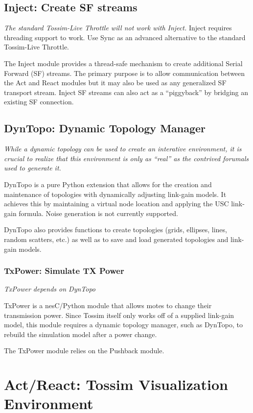 \subsection{Inject: Create SF streams}

{\em The standard Tossim-Live Throttle will not work with Inject.}
Inject requires threading support to work. Use Sync as an advanced
alternative to the standard Tossim-Live Throttle.

The Inject module provides a thread-safe mechanism to create
additional Serial Forward (SF) streams. The primary purpose is to
allow communication between the Act and React modules but it may also
be used as any generalized SF transport stream. Inject SF streams can
also act as a ``piggyback'' by bridging an existing SF connection.


\subsection{DynTopo: Dynamic Topology Manager}

\emph{While a dynamic topology can be used to create an interative
  environment, it is crucial to realize that this environment is only
  as ``real'' as the contrived forumals used to generate it.}

DynTopo is a pure Python extension that allows for the creation and
maintenance of topologies with dynamically adjusting link-gain
models. It achieves this by maintaining a virtual node location and
applying the USC link-gain formula. Noise generation is not currently
supported.

DynTopo also provides functions to create topologies (grids, ellipses,
lines, random scatters, etc.) as well as to save and load generated
topologies and link-gain models.


\subsubsection{TxPower: Simulate TX Power}

{\em TxPower depends on DynTopo}

TxPower is a nesC/Python module that allows motes to change their
transmission power. Since Tossim itself only works off of a supplied
link-gain model, this module requires a dynamic topology manager, such
as DynTopo, to rebuild the simulation model after a power change.

The TxPower module relies on the Pushback module.


\section{Act/React: Tossim Visualization Environment}


